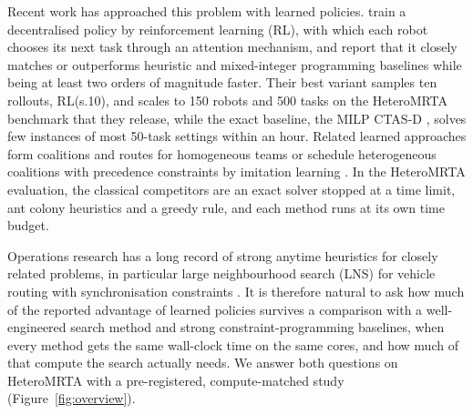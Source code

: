 Recent work has approached this problem with learned policies. \citet{dai2025heterogeneous} train a decentralised
policy by reinforcement learning (RL), with which each robot chooses its next task through an attention mechanism,
and report that it closely matches or outperforms heuristic and mixed-integer programming baselines while being at
least two orders of magnitude faster. Their best variant samples ten rollouts, RL(s.10), and scales to 150 robots and
500 tasks on the HeteroMRTA benchmark that they release, while the exact baseline, the MILP CTAS-D
\cite{fu2023robust}, solves few instances of most 50-task settings within an hour. Related learned approaches form
coalitions and routes for homogeneous teams \cite{dai2024dynamic} or schedule heterogeneous coalitions with precedence
constraints by imitation learning \cite{bichler2025sadcher}. In the HeteroMRTA evaluation, the classical competitors
are an exact solver stopped at a time limit, ant colony heuristics \cite{babincsak2023ant} and a greedy rule, and
each method runs at its own time budget.

Operations research has a long record of strong anytime heuristics for closely related problems, in particular
large neighbourhood search (LNS) for vehicle routing with synchronisation constraints
\cite{drexl2012synchronization,hojabri2018large,parragh2018solving}. It is therefore natural to ask how much of the
reported advantage of learned policies survives a comparison with a well-engineered search method and strong
constraint-programming baselines, when every method gets the same wall-clock time on the same cores, and how much of
that compute the search actually needs. We answer both questions on HeteroMRTA with a pre-registered, compute-matched
study (Figure~\ref{fig:overview}).

